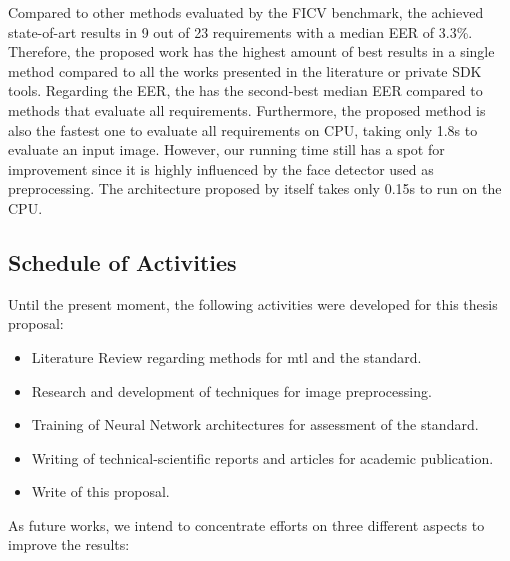 Compared to other methods evaluated by the FICV benchmark, the \methodname achieved state-of-art results in 9 out of 23 requirements with a median EER of 3.3\%. Therefore, the proposed work has the highest amount of best results in a single method compared to all the works presented in the literature or private SDK tools. Regarding the EER, the \methodname has the second-best median EER compared to methods that evaluate all requirements. Furthermore, the proposed method is also the fastest one to evaluate all requirements on CPU, taking only 1.8s to evaluate an input image. However, our running time still has a spot for improvement since it is highly influenced by the face detector used as preprocessing. The architecture proposed by itself takes only 0.15s to run on the CPU.

\subsection{Schedule of Activities}

Until the present moment, the following activities were developed for this thesis proposal:

\begin{itemize}
\item Literature Review regarding methods for \acl{mtl} and the \icao standard.
\item Research and development of techniques for image preprocessing.
\item Training of Neural Network architectures for assessment of the \icao standard.
\item Writing of technical-scientific reports and articles for academic publication.
\item Write of this proposal.
\end{itemize}

As future works, we intend to concentrate efforts on three different aspects to improve the results:

